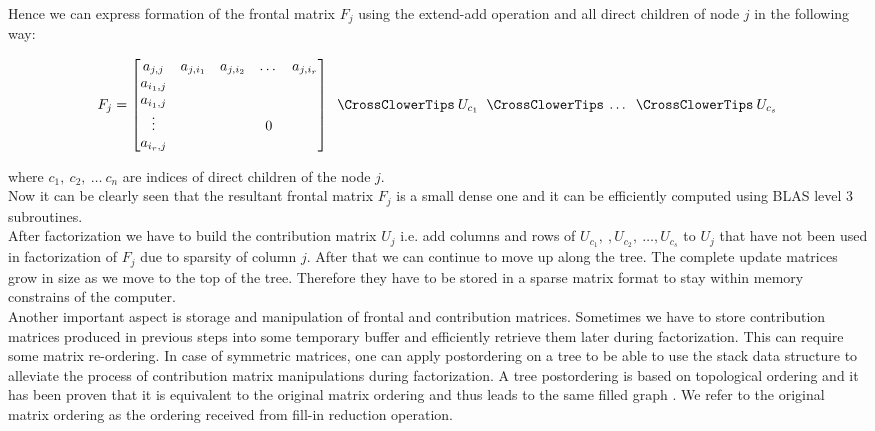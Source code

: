 Hence we can express formation of the frontal matrix $F_{j}$ using the extend-add operation and all direct children of node $j$ in the following way:


\begin{equation} \label{eq:mm-9}
	F_{j} = \begin{bmatrix}a_{j,j} & a_{j,i_1} & a_{j,i_2} & \dots & a_{j,i_r} \\
a_{i_1,j} \\
a_{i_1,j} \\
\vdots & & & 0\\
a_{i_r,j} \\
\end{bmatrix} \extendadd U_{c_1} \extendadd \dots \extendadd U_{c_s} 
\end{equation}

where $c_{1}, \: c_{2}, \: \dots \: c_{n}$ are indices of direct children of the node $j$.\\

Now it can be clearly seen that the resultant frontal matrix $F_{j}$ is a small dense one and it can be efficiently computed using BLAS level 3 subroutines.\\

After factorization we have to build the contribution matrix $U_{j}$ i.e. add columns and rows of $U_{c_1}, \:, U_{c_2}, \: \dots, U_{c_s}$ to $U_{j}$ that have not been used in factorization of $F_{j}$ due to sparsity of column $j$. After that we can continue to move up along the tree. 
The complete update matrices grow in size as we move to the top of the tree. Therefore they have to be stored in a sparse matrix format to stay within memory constrains of the computer.\\


Another important aspect is storage and manipulation of frontal and contribution matrices. Sometimes we have to store contribution matrices produced in previous steps into some temporary buffer and efficiently retrieve them later during factorization. This can require some matrix re-ordering. In case of symmetric matrices, one can apply postordering on a tree to be able to use the stack data structure to alleviate the process of contribution matrix manipulations during factorization. A tree postordering is based on topological ordering and it has been proven that it is equivalent to the original matrix ordering and thus leads to the same filled graph \cite{mult-frontal-original:2}.  We refer to the original matrix ordering as the ordering received from fill-in reduction operation.\\


